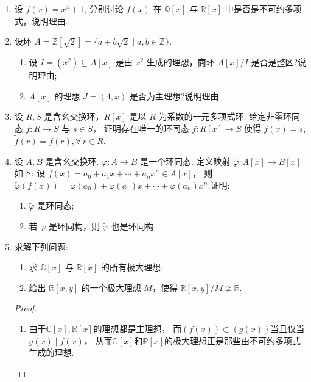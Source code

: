 \begin{enumerate}
\item 设 $ f(x) = x^4 + 1 $, 分别讨论 $ f(x) $ 在 $ \mathbb{Q}[x] $ 与 $ \mathbb{R}[x] $ 中是否是不可约多项式，说明理由.

\item 设环 $ A = \mathbb{Z}[\sqrt{2}] = \{ a + b\sqrt{2} \mid a, b \in \mathbb{Z} \} $.
\begin{enumerate}[label=(\arabic*)]
    \item 设 $ I = (x^2) \subseteq A[x] $ 是由 $ x^2 $ 生成的理想，商环 $ A[x]/I $ 是否是整区?说明理由;
    \item $ A[x] $ 的理想 $ J = (4, x) $ 是否为主理想?说明理由.
\end{enumerate}

\item 设 $ R, S $ 是含幺交换环，$ R[x] $ 是以 $ R $ 为系数的一元多项式环.
给定非零环同态 $ f : R \to S $ 与 $ s \in S $，
证明存在唯一的环同态 $ \tilde{f} : R[x] \to S $ 
使得 $ \tilde{f}(x) = s $, $ \tilde{f}(r) = f(r), \forall \, r \in R $.

\item 设 $ A, B $ 是含幺交换环. $\varphi : A \to B$ 是一个环同态.
定义映射 $\tilde{\varphi} : A[x] \to B[x]$ 如下:
设 $ f(x) = a_0 + a_1 x + \cdots + a_n x^n \in A[x] $，
则 $\tilde{\varphi}(f(x)) = \varphi(a_0) + \varphi(a_1)x + \cdots + \varphi(a_n)x^n $.证明:
\begin{enumerate}[label=(\arabic*)]
    \item $\tilde{\varphi}$ 是环同态;
    \item 若 $\varphi$ 是环同构，则 $\tilde{\varphi}$ 也是环同构.
\end{enumerate}

\item 求解下列问题:
\begin{enumerate}[label=(\arabic*)]
    \item 求 $ \mathbb{C}[x] $ 与 $ \mathbb{R}[x] $ 的所有极大理想;
    \item 给出 $ \mathbb{R}[x,y] $ 的一个极大理想 $ M $，使得 $ \mathbb{R}[x,y]/M \not \cong \mathbb{R} $.
\end{enumerate}
\begin{proof}
    \begin{enumerate}[label=(\arabic*)]
        \item 由于$ \mathbb{C}[x] , \mathbb{R}[x] $的理想都是主理想，
        而$(f(x))\subset(g(x))$当且仅当$g(x) \mid f(x)$，
        从而$ \mathbb{C}[x] $和$ \mathbb{R}[x] $的极大理想正是那些由不可约多项式生成的理想.


\end{enumerate}
\end{proof}
\end{enumerate}
